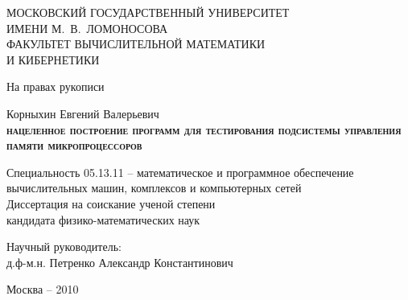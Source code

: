 \documentclass[14pt]{extreport}
\begin{document}
\thispagestyle{empty}

\begin{singlespace}
\begin{center}
%
МОСКОВСКИЙ ГОСУДАРСТВЕННЫЙ УНИВЕРСИТЕТ\\ ИМЕНИ М.~В.~ЛОМОНОСОВА\\[0.5cm]

ФАКУЛЬТЕТ ВЫЧИСЛИТЕЛЬНОЙ МАТЕМАТИКИ\\ И КИБЕРНЕТИКИ\\[1cm]
\end{center}

\begin{flushright}
На правах рукописи\\[2cm]
\end{flushright}

\begin{center}
Корныхин Евгений Валерьевич\\[1cm]
\textbf{%
\huge{%
\textsc{нацеленное построение программ
для тестирования
подсистемы управления памяти микропроцессоров}}\\[0.5cm]}

Специальность 05.13.11 -- математическое и программное обеспечение
вычислительных машин, комплексов и компьютерных сетей\\[1.5cm]


Диссертация на соискание ученой степени\\
кандидата физико-математических наук
\end{center}

\vspace{0.7cm}

\begin{flushright} Научный руководитель:\\
д.ф-м.н. Петренко Александр Константинович
\end{flushright}

\vspace{1.5cm}

\begin{center}
Москва -- 2010
\end{center}


\end{singlespace}
\end{document}
